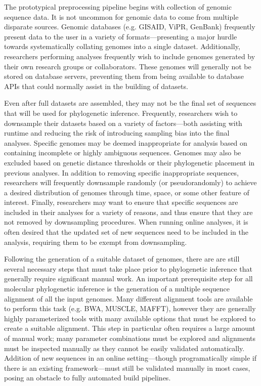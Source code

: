 The prototypical preprocessing pipeline begins with collection of genomic sequence data.
It is not uncommon for genomic data to come from multiple disparate sources.
Genomic databases (e.g. GISAID\cite{shu2017gisaid}, ViPR\cite{pickett2012vipr}, GenBank\cite{benson2012genbank}) frequently present data to the user in a variety of formats---presenting a major hurdle towards systematically collating genomes into a single dataset.
Additionally, researchers performing analyses frequently wish to include genomes generated by their own research groups or collaborators.
These genomes will generally not be stored on database servers, preventing them from being available to database APIs that could normally assist in the building of datasets.

Even after full datasets are assembled, they may not be the final set of sequences that will be used for phylogenetic inference.
Frequently, researchers wish to downsample their datasets based on a variety of factors---both assisting with runtime and reducing the risk of introducing sampling bias into the final analyses.
Specific genomes may be deemed inappropriate for analysis based on containing incomplete or highly ambiguous sequences.
Genomes may also be excluded based on genetic distance thresholds or their phylogenetic placement in previous analyses.
In addition to removing specific inappropriate sequences, researchers will frequently downsample randomly (or pseudorandomly) to achieve a desired distribution of genomes through time, space, or some other feature of interest.
Finally, researchers may want to ensure that specific sequences are included in their analyses for a variety of reasons, and thus ensure that they are not removed by downsampling procedures.
When running online analyses, it is often desired that the updated set of new sequences need to be included in the analysis, requiring them to be exempt from downsampling.

Following the generation of a suitable dataset of genomes, there are are still several necessary steps that must take place prior to phylogenetic inference that generally require significant manual work.
An important prerequisite step for all molecular phylogenetic inference is the generation of a multiple sequence alignment of all the input genomes.
Many different alignment tools are available to perform this task (e.g. BWA, MUSCLE, MAFFT), however they are generally highly parameterized tools with many available options that must be explored to create a suitable alignment.
This step in particular often requires a large amount of manual work; many parameter combinations must be explored and alignments must be inspected manually as they cannot be easily validated automatically.
Addition of new sequences in an online setting---though programatically simple if there is an existing framework---must still be validated manually in most cases, posing an obstacle to fully automated build pipelines.


